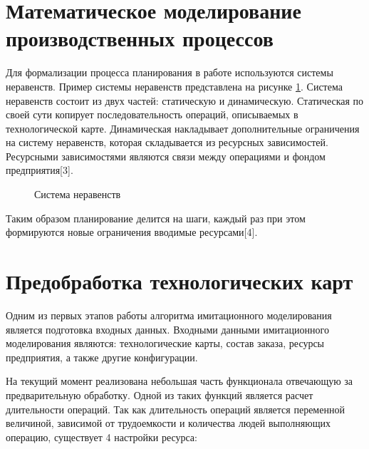 \section{Математическое моделирование производственных процессов}

Для формализации процесса планирования в работе используются системы неравенств. Пример системы неравенств представлена на рисунке \ref{ris:sys1}. Система неравенств состоит из двух частей: статическую и динамическую. Статическая по своей сути копирует последовательность операций, описываемых в технологической карте. Динамическая накладывает дополнительные ограничения на систему неравенств, которая складывается из ресурсных зависимостей. Ресурсными зависимостями являются связи между операциями и фондом предприятия[3].

\begin{figure}[H]
    \caption{Система неравенств}
    \label{ris:sys1}
\end{figure}

Таким образом планирование делится на шаги, каждый раз при этом формируются новые ограничения вводимые ресурсами[4].

\section{Предобработка технологических карт}

Одним из первых этапов работы алгоритма имитационного моделирования является подготовка входных данных. Входными данными имитационного моделирования являются: технологические карты, состав заказа, ресурсы предприятия, а также другие конфигурации.

На текущий момент реализована небольшая часть функционала отвечающую за предварительную обработку. Одной из таких функций является расчет длительности операций. Так как длительность операций является переменной величиной, зависимой от трудоемкости и количества людей выполняющих операцию, существует 4 настройки ресурса:

